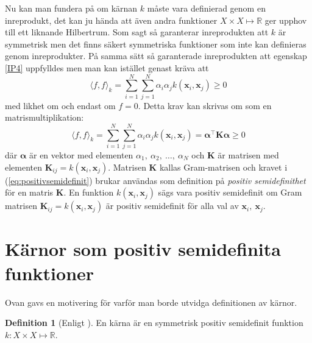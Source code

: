 \documentclass[a4paper, 12pt]{report}
\theoremstyle{definition}
\newtheorem{defi}{Definition}[section]
\theoremstyle{remark}
\newcommand{\bfx}{\mathbf{x}}
\begin{document}
Nu kan man fundera på om kärnan $k$ måste vara definierad genom en inreprodukt, det kan ju hända att även andra funktioner $X \times X \longmapsto \mathbb{R}$ ger upphov till ett liknande Hilbertrum. Som sagt så garanterar inreprodukten att $k$ är symmetrisk men det finns säkert symmetriska funktioner som inte kan definieras genom inreprodukter. På samma sätt så garanterade inreprodukten att egenskap \ref{IP4} uppfylldes men man kan istället genast kräva att
\begin{equation*}
	\langle f, f \rangle_k = \sum_{i=1}^{N}\sum_{j=1}^{N}\alpha_i\alpha_jk\left(\bfx_i, \bfx_j\right) \geq 0
\end{equation*}
med likhet om och endast om $f=0$. Detta krav kan skrivas om som en matrismultiplikation:
\begin{equation}\label{eq:positivsemidefinit}
\langle f, f \rangle_k = \sum_{i=1}^{N}\sum_{j=1}^{N}\alpha_i\alpha_jk\left(\bfx_i, \bfx_j\right) = \boldsymbol{\alpha}^\intercal \mathbf{K} \boldsymbol{\alpha}\geq 0
\end{equation}
där $\boldsymbol{\alpha}$ är en vektor med elementen $\alpha_1,~\alpha_2,~\dots,~\alpha_N$ och $\mathbf{K}$ är matrisen med elementen $\mathbf{K}_{ij}=k\left(\bfx_i, \bfx_j\right)$. Matrisen $\mathbf{K}$ kallas Gram-matrisen och kravet i (\ref{eq:positivsemidefinit}) brukar användas som definition på \emph{positiv semidefinithet} för en matris $\mathbf{K}$. En funktion $k\left(\bfx_i, \bfx_j\right)$ sägs vara positiv semidefinit om Gram matrisen $\mathbf{K}_{ij}=k\left(\bfx_i, \bfx_j\right)$ är positiv semidefinit för alla val av $\bfx_i,~\bfx_j$.
\newpage
\section{Kärnor som positiv semidefinita funktioner}

Ovan gavs en motivering för varför man borde utvidga definitionen av kärnor.
\begin{defi}[Enligt \cite{LearningKernels}]
	En kärna är en symmetrisk positiv semidefinit funktion $k: X \times X \longmapsto \mathbb{R}$.
\end{defi}
\end{document}
